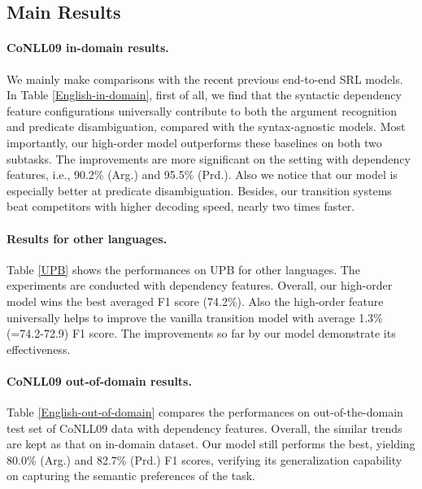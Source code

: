 \documentclass[letterpaper]{article} %
\begin{document}
\begin{CJK}{UTF8}{gbsn}
\subsection{Main Results}

\paragraph{CoNLL09 in-domain results.}

We mainly make comparisons with the recent previous end-to-end SRL models.
In Table \ref{English-in-domain}, first of all, we find that the syntactic dependency feature configurations universally contribute to both the argument recognition and predicate disambiguation, compared with the syntax-agnostic models.
Most importantly, our high-order model outperforms these baselines on both two subtasks.
The improvements are more significant on the setting with dependency features, i.e., 90.2\% (Arg.) and 95.5\% (Prd.).
Also we notice that our model is especially better at predicate disambiguation.
Besides, our transition systems beat competitors with higher decoding speed, nearly two times faster.





\paragraph{Results for other languages.}
Table \ref{UPB} shows the performances on UPB for other languages.
The experiments are conducted with dependency features.
Overall, our high-order model wins the best averaged F1 score (74.2\%).
Also the high-order feature universally helps to improve the vanilla transition model with average 1.3\%(=74.2-72.9) F1 score.
The improvements so far by our model demonstrate its effectiveness.






\paragraph{CoNLL09 out-of-domain results.}

Table \ref{English-out-of-domain} compares the performances on out-of-the-domain test set of CoNLL09 data with dependency features.
Overall, the similar trends are kept as that on in-domain dataset.
Our model still performs the best, yielding 80.0\% (Arg.) and 82.7\% (Prd.) F1 scores, verifying its generalization capability on capturing the semantic preferences of the task.









\end{CJK}
\end{document}
